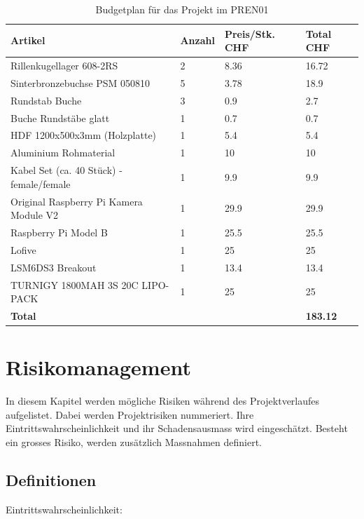 \documentclass[a4paper]{report}
\begin{document}
\vspace{1em}
\noindent
\begin{table}[h]
	\begin{tabular}{|p{}|p{}|p{}||p{}|}
	\hline
	\textbf{Artikel} & \textbf{Anzahl} & \textbf{Preis/Stk. CHF} & \textbf{Total CHF} \\
	\hline
	Rillenkugellager 608-2RS & 2 & 8.36 & 16.72 \\
	\hline
	Sinterbronzebuchse PSM 050810 & 5 & 3.78 & 18.9 \\
	\hline
	Rundstab Buche & 3 & 0.9 & 2.7 \\
	\hline
	Buche Rundstäbe glatt & 1 & 0.7 & 0.7 \\
	\hline
	HDF 1200x500x3mm (Holzplatte) & 1 & 5.4 & 5.4 \\
	\hline
	Aluminium Rohmaterial & 1 & 10 & 10 \\
	\hline
	Kabel Set (ca. 40 Stück) - female/female & 1 & 9.9 & 9.9 \\
	\hline
	Original Raspberry Pi Kamera Module V2 & 1 & 29.9 & 29.9 \\
	\hline
	Raspberry Pi Model B & 1 & 25.5 & 25.5 \\
	\hline
	Lofive & 1 & 25 & 25 \\
	\hline
	LSM6DS3 Breakout & 1 & 13.4 & 13.4 \\
	\hline
	TURNIGY 1800MAH 3S 20C LIPO-PACK & 1 & 25 & 25\\
	\hline
	\textbf{Total} & & & \textbf{183.12} \\
	\hline
	\end{tabular}
	\caption{Budgetplan für das Projekt im PREN01}
	\label{tab:Budgetplan}
\end{table}

\chapter{Risikomanagement}
\label{ch:RisikoMgmt}
In diesem Kapitel werden mögliche Risiken während des Projektverlaufes aufgelistet. Dabei werden Projektrisiken nummeriert. Ihre Eintrittswahrscheinlichkeit und ihr Schadensausmass wird eingeschätzt. Besteht ein grosses Risiko, werden zusätzlich Massnahmen definiert.

\section{Definitionen}
\label{sec:Def}
\vspace{1em}
\noindent
Eintrittswahrscheinlichkeit:
\end{document}
